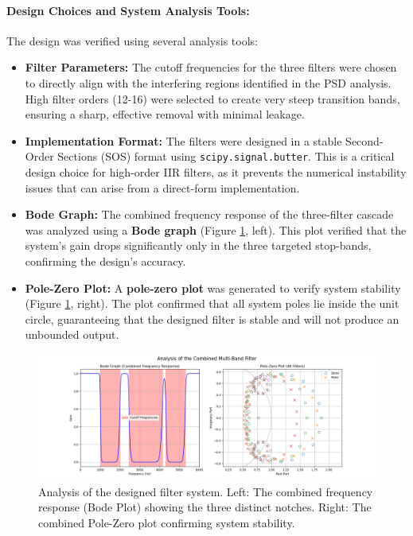 \documentclass[11pt, a4paper]{article}
\begin{document}
\paragraph{Design Choices and System Analysis Tools:}
The design was verified using several analysis tools:
\begin{itemize}
    \item \textbf{Filter Parameters:} The cutoff frequencies for the three filters were chosen to directly align with the interfering regions identified in the PSD analysis. High filter orders (12-16) were selected to create very steep transition bands, ensuring a sharp, effective removal with minimal leakage.
    
    \item \textbf{Implementation Format:} The filters were designed in a stable Second-Order Sections (SOS) format using \texttt{scipy.signal.butter}. This is a critical design choice for high-order IIR filters, as it prevents the numerical instability issues that can arise from a direct-form implementation.
    
    \item \textbf{Bode Graph:} The combined frequency response of the three-filter cascade was analyzed using a \textbf{Bode graph} (Figure \ref{fig:filter_analysis}, left). This plot verified that the system's gain drops significantly only in the three targeted stop-bands, confirming the design's accuracy.
    
    \item \textbf{Pole-Zero Plot:} A \textbf{pole-zero plot} was generated to verify system stability (Figure \ref{fig:filter_analysis}, right). The plot confirmed that all system poles lie inside the unit circle, guaranteeing that the designed filter is stable and will not produce an unbounded output.
\end{itemize}

\begin{figure}[H]
    \centering
    \includegraphics[width=\textwidth]{q2_part2_filter_analysis.png}
    \caption{Analysis of the designed filter system. Left: The combined frequency response (Bode Plot) showing the three distinct notches. Right: The combined Pole-Zero plot confirming system stability.}
    \label{fig:filter_analysis}
\end{figure}
\end{document}
